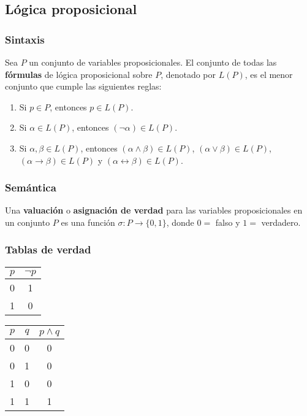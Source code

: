 \begin{multicols}{2}
    \section{Lógica proposicional}
    \subsubsection*{Sintaxis}
    Sea $P$ un conjunto de variables proposicionales. El conjunto de todas las \textbf{fórmulas} de lógica proposicional sobre $P$, denotado por $L(P)$, es el menor conjunto que cumple las siguientes reglas:
    \begin{enumerate}
        \item Si $p \in P$, entonces $p \in L(P)$.
        \item Si $\alpha \in L(P)$, entonces $(\neg \alpha) \in L(P)$.
        \item Si $\alpha, \beta \in L(P)$, entonces $(\alpha \wedge \beta ) \in L(P)$, $(\alpha \vee \beta) \in L(P)$, $(\alpha \rightarrow \beta) \in L(P)$ y $(\alpha \leftrightarrow \beta) \in L(P)$.
    \end{enumerate}
    
    \subsubsection*{Semántica}
    Una \textbf{valuación} o \textbf{asignación de verdad} para las variables proposicionales en un conjunto $P$ es una función $\sigma: P \rightarrow \{0,1\}$, donde $0 =$ falso y $1 = $ verdadero.
    
    \subsubsection*{Tablas de verdad}
    \begin{multicols}{2}
        \begin{table}[H]
            \begin{tabular}{c|c}
                $p$ & $\neg p$ \\ \hline
                0   & 1        \\
                1   & 0
            \end{tabular}
        \end{table}
    
        \begin{table}[H]
            \begin{tabular}{cc|c}
                $p$ & $q$ & $p \wedge q$ \\ \hline
                0   & 0   & 0            \\
                0   & 1   & 0            \\
                1   & 0   & 0            \\
                1   & 1   & 1
            \end{tabular}
        \end{table}
    

\end{multicols}
\end{multicols}
